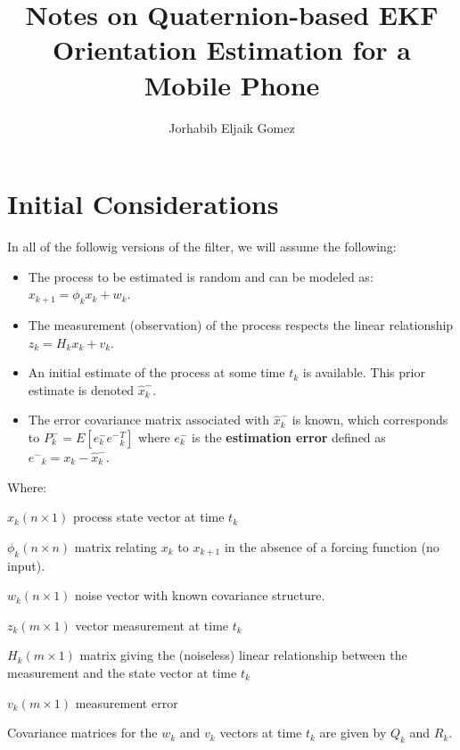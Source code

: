 \documentclass[a4paper,10pt]{article}
\title{Notes on Quaternion-based EKF Orientation Estimation for a Mobile Phone }
\author{Jorhabib Eljaik Gomez}
\date{}
\begin{document}
\maketitle


\section{Initial Considerations}
In all of the followig versions of the filter, we will assume the following:

\begin{itemize}
 \item The process to be estimated is random and can be modeled as:
 $x_{k+1} = \phi_k x_k + w_k$.
 \item The measurement (observation) of the process respects the linear relationship $z_k = H_k x_k + v_k$.
 \item An initial estimate of the process at some time $t_k$ is available. This prior estimate is denoted $\hat{x}^{-}_k$.
 \item  The error covariance matrix associated with $\hat{x}^{-}_k$ is known, which corresponds to $P^{-}_k = E[e^{-}_k {e^{-}}^T_k]$ where $e^{-}_k$ is the \textbf{estimation error} defined as ${e^{-}}_k = x_k - \hat{x}^{-}_k$.
\end{itemize}

Where:
\begin{list}{variables}{}
 \item $x_k (n \times 1)$ process state vector at time $t_k$
 \item $\phi_k (n \times n)$ matrix relating $x_k$ to $x_{k+1}$ in the absence of a forcing function (no input).
 \item $w_k (n \times 1)$ noise vector with known covariance structure.
 \item $z_k (m \times 1)$ vector measurement at time $t_k$
 \item $H_k (m \times 1)$ matrix giving the (noiseless) linear relationship between the measurement and the state vector at time $t_k$
 \item $v_k (m \times 1)$ measurement error
\end{list}

Covariance matrices for the $w_k$ and $v_k$ vectors at time $t_k$ are given by $Q_k$ and $R_k$.
\end{document}
